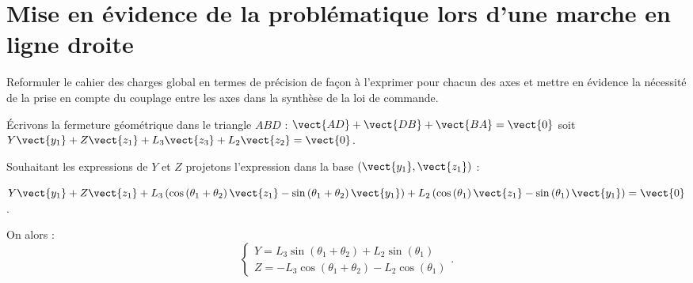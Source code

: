 \section{Mise en évidence de la problématique lors d'une marche en ligne droite}
\ifprof
\else
\begin{obj}
{Reformuler le cahier des charges global en termes de précision de façon à l'exprimer pour chacun des axes et mettre en évidence la nécessité de la prise en compte du couplage entre les axes dans la synthèse de la loi de commande.}
\end{obj}
\fi

\ifprof
\begin{corrige}
Écrivons la fermeture géométrique dans le triangle $ABD$ : $\vect{AD}+ \vect{DB}+\vect{BA} = \vect{0}$ soit $Y\vect{y_1}+Z\vect{z_1}+ L_3 \vect{z_3}+ L_2 \vect{z_2} = \vect{0}$.

Souhaitant les expressions de $Y$ et $Z$ projetons l'expression dans la base $\left(\vect{y_1},\vect{z_1}\right)$ :

$Y\vect{y_1}+Z\vect{z_1}
+L_3 \left( \cos \left(\theta_1 + \theta_2 \right) \vect{z_1} - \sin \left(\theta_1 + \theta_2 \right) \vect{y_1}\right) 
+ L_2 \left( \cos \left(\theta_1 \right) \vect{z_1} - \sin \left(\theta_1  \right) \vect{y_1}\right)  = \vect{0}$.

On alors :
$$
\left\{
\begin{array}{l}
Y =  L_3 \sin  \left(\theta_1 + \theta_2 \right)  + L_2 \sin \left(\theta_1  \right) \\
Z =- L_3 \cos \left(\theta_1 + \theta_2 \right) - L_2 \cos \left(\theta_1 \right)  
\end{array}.
\right.
$$

\end{corrige}\else\fi


